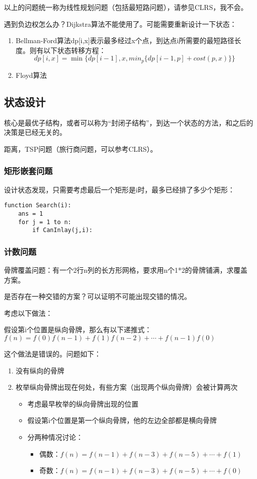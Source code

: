 \documentclass{article}
\begin{document}
以上的问题统一称为线性规划问题（包括最短路问题），请参见CLRS，我不会。

遇到负边权怎么办？Dijkstra算法不能使用了。可能需要重新设计一下状态：
\begin{enumerate}
\item{Bellman-Ford算法}dp[i,x]表示最多经过x个点，到达点i所需要的最短路径长度。则有以下状态转移方程：
\begin{equation*}
dp[i,x]=\min\{dp[i-1],x,min_p\{dp[i-1,p]+cost(p,x)\}\}
\end{equation*}
\item{Floyd算法}
\end{enumerate}
\subsection{状态设计}
核心是最优子结构，或者可以称为“封闭子结构”，到达一个状态的方法，和之后的决策是已经无关的。

距离，TSP问题（旅行商问题，可以参考CLRS）。
\subsubsection{矩形嵌套问题}
设计状态发现，只需要考虑最后一个矩形是i时，最多已经排了多少个矩形：
\begin{verbatim}
function Search(i):
    ans = 1
    for j = 1 to n:
        if CanInlay(j,i):
\end{verbatim}
\subsubsection{计数问题}
骨牌覆盖问题：有一个2行n列的长方形网格，要求用n个1*2的骨牌铺满，求覆盖方案。

是否存在一种交错的方案？可以证明不可能出现交错的情况。

考虑以下做法：

假设第i个位置是纵向骨牌，那么有以下递推式：
$f(n)=f(0)f(n-1)+f(1)f(n-2)+\cdots+f(n-1)f(0)$

这个做法是错误的。问题如下：
\begin{enumerate}
  \item{没有纵向的骨牌}
  \item{枚举纵向骨牌出现在何处，有些方案（出现两个纵向骨牌）会被计算两次}
  \begin{itemize}
    \item{考虑最早枚举的纵向骨牌出现的位置}
    \item{假设第i个位置是第一个纵向骨牌，他的左边全部都是横向骨牌}
    \item{分两种情况讨论：}
    \begin{itemize}
      \item{偶数：$f(n)=f(n-1)+f(n-3)+f(n-5)+\cdots+f(1)$}
      \item{奇数：$f(n)=f(n-1)+f(n-3)+f(n-5)+\cdots+f(0)$}
    \end{itemize}
  \end{itemize}
\end{enumerate}
\end{document}
